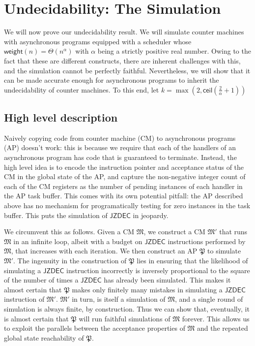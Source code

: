 \documentclass{article}
\theoremstyle{remark}
\newcommand{\program}{\mathfrak{P}}
\newcommand{\machine}{\mathfrak{M}}
\newcommand{\weight}{\mathsf{weight}}
\newcommand{\jzdec}{\mathsf{JZDEC}}
\begin{document}
\section{Undecidability: The Simulation}
We will now prove our undecidability result. We will simulate counter machines with asynchronous programs equipped with a scheduler whose $\weight(n) = \Theta(n^\alpha)$ with $\alpha$ being a strictly positive real number. Owing to the fact that these are different constructs, there are inherent challenges with this, and the simulation cannot be perfectly faithful. Nevertheless, we will show that it can be made accurate enough for asynchronous programs to inherit the undecidability of counter machines. To this end, let $k = \max\left(2, \mathsf{ceil}\left(\frac{2}{\alpha}+1\right)\right)$

\subsection{High level description}
Naively copying code from counter machine (CM) to asynchronous programs (AP) doesn't work: this is because we require that each of the handlers of an asynchronous program has code that is guaranteed to terminate. Instead, the high level idea is to encode the instruction pointer and acceptance status of the CM in the global state of the AP, and capture the non-negative integer count of each of the CM registers as the number of pending instances of each handler in the AP task buffer. This comes with its own potential pitfall: the AP described above has no mechanism for programatically testing for zero instances in the task buffer. This puts the simulation of $\jzdec$ in jeopardy.

We circumvent this as follows. Given a CM $\machine$, we construct a CM $\machine'$ that runs $\machine$ in an infinite loop, albeit with a budget on $\jzdec$ instructions performed by $\machine$, that increases with each iteration. We then construct an AP $\program$ to simulate $\machine'$. The ingenuity in the construction of $\program$ lies in ensuring that the likelihood of simulating a $\jzdec$ instruction incorrectly is inversely proportional to the square of the number of times a $\jzdec$ has already been simulated. This makes it almost certain that $\program$ makes only finitely many mistakes in simulating a $\jzdec$ instruction of $\machine'$. $\machine'$ in turn, is itself a simulation of $\machine$, and a single round of simulation is always finite, by construction. Thus we can show that, eventually, it is almost certain that $\program$ will run faithful simulations of $\machine$ forever. This allows us to exploit the parallels between the acceptance properties of $\machine$ and the repeated global state reachability of $\program$.
\end{document}
